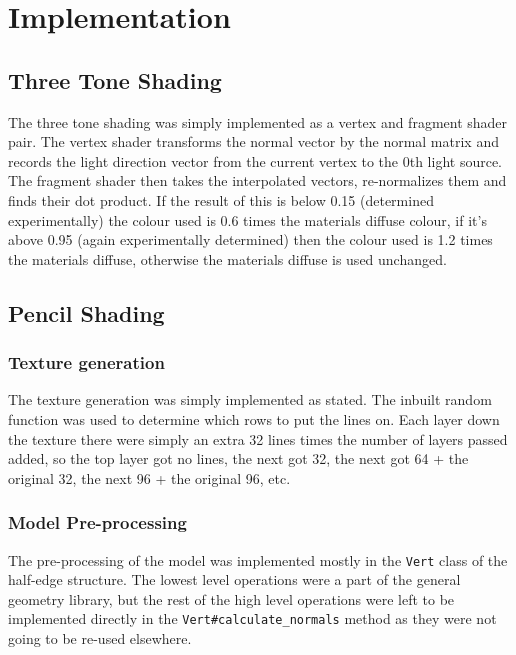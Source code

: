 \section{Implementation}

  \subsection{Three Tone Shading}

    The three tone shading was simply implemented as a vertex and fragment
    shader pair.  The vertex shader transforms the normal vector by the normal
    matrix and records the light direction vector from the current vertex to the
    0th light source.  The fragment shader then takes the interpolated vectors,
    re-normalizes them and finds their dot product.  If the result of this is
    below 0.15 (determined experimentally) the colour used is 0.6 times the
    materials diffuse colour, if it's above 0.95 (again experimentally
    determined) then the colour used is 1.2 times the materials diffuse,
    otherwise the materials diffuse is used unchanged.

  \subsection{Pencil Shading}

    \subsubsection{Texture generation}

      The texture generation was simply implemented as stated.  The inbuilt
      random function was used to determine which rows to put the lines on.
      Each layer down the texture there were simply an extra 32 lines times the
      number of layers passed added, so the top layer got no lines, the next got
      32, the next got 64 + the original 32, the next 96 + the original 96, etc.

    \subsubsection{Model Pre-processing}

      The pre-processing of the model was implemented mostly in the
      \texttt{Vert} class of the half-edge structure.  The lowest level
      operations were a part of the general geometry library, but the rest of
      the high level operations were left to be implemented directly in the
      \texttt{Vert\#calculate\_normals} method as they were not going to be
      re-used elsewhere.


